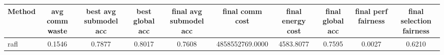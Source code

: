 \begin{tabular}{lccccccccc}
\toprule
Method & avg comm waste & best avg submodel acc & best global acc & final avg submodel acc & final comm cost & final energy cost & final global acc & final perf fairness & final selection fairness \\
\midrule
rafl & 0.1546 & 0.7877 & 0.8017 & 0.7608 & 4858552769.0000 & 4583.8077 & 0.7595 & 0.0027 & 0.6210 \\
\bottomrule
\end{tabular}
